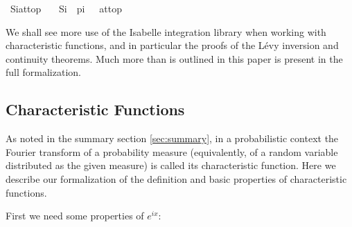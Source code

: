 \documentclass[leqno]{article}
\theoremstyle{definition}
\begin{document}
\medskip

\begin{isabellebody}
\isamarkupfalse%
\ Si{\isacharunderscore}at{\isacharunderscore}top{\isacharcolon}\isanewline
\ \ \ {\isachardoublequoteopen}{\isacharparenleft}Si\ {\isacharminus}{\isacharminus}{\isacharminus}{\isachargreater}\ pi\ {\isacharslash}\ {}{\isacharparenright}\ at{\isacharunderscore}top{\isachardoublequoteclose}
\end{isabellebody}

\medskip

We shall see more use of the Isabelle integration library when working with characteristic functions, and in particular the proofs of the L\'evy inversion and continuity theorems. Much more than is outlined in this paper is present in the full formalization.

\subsection{Characteristic Functions} \label{sec:char}

As noted in the summary section \ref{sec:summary}, in a probabilistic context the Fourier transform of a probability measure (equivalently, of a random variable distributed as the given measure) is called its characteristic function. Here we describe our formalization of the definition and basic properties of characteristic functions.

First we need some properties of $e^{ix}$:

\newpage
\end{document}
